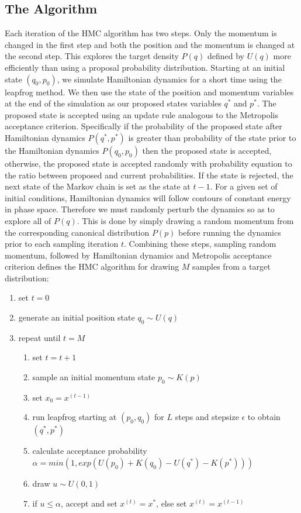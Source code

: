 \documentclass{article}
\numberwithin{equation}{section}
\begin{document}
\subsection{The Algorithm}
Each iteration of the HMC algorithm has two steps. Only the momentum is changed in the first step and both the position and the momentum is changed at the second step. This explores the target density $P(q)$ defined by $U(q)$ more efficiently than using a proposal probability distribution. Starting at an initial state $(q_0,p_0)$, we simulate Hamiltonian dynamics for a short time using the leapfrog method. We then use the state of the position and momentum variables at the end of the simulation as our proposed states variables $q^*$ and $p^*$. The proposed state is accepted using an update rule analogous to the Metropolis acceptance criterion. Specifically if the probability of the proposed state after Hamiltonian dynamics $P(q^*,p^*)$ is greater than probability of the state prior to the Hamiltonian dynamics $P(q_0,p_0)$ then the proposed state is accepted, otherwise, the proposed state is accepted randomly with probability equation to the ratio between proposed and current probabilities. If the state is rejected, the next state of the Markov chain is set as the state at $t-1$. For a given set of initial conditions, Hamiltonian dynamics will follow contours of constant energy in phase space. Therefore we must randomly perturb the dynamics so as to explore all of $P(q)$. This is done by simply drawing a random momentum from the corresponding canonical distribution $P(p)$  before running the dynamics prior to each sampling iteration $t$. Combining these steps, sampling random momentum, followed by Hamiltonian dynamics and Metropolis acceptance criterion defines the HMC algorithm for drawing $M$ samples from a target distribution:


\begin{enumerate}
\item set $t=0$
\item generate an initial position state $q_0 \sim U(q)$
\item repeat until $t=M$
\begin{enumerate}
\item set $t=t+1$
\item sample an initial momentum state $p_0 \sim K(p)$
\item set $x_0 = x^{(t-1)}$
\item run leapfrog starting at $(p_0,q_0)$ for $L$ steps and stepsize $\epsilon$ to obtain $(q^*,p^*)$
\item calculate acceptance probability $\alpha = min(1, exp(U(p_0)+K(q_0)-U(q^*)-K(p^*)))$
\item draw $u \sim U(0,1)$
\item if $u \leq \alpha$, accept and set $x^{(t)} = x^*$, else set  $x^{(t)} = x^{(t-1)}$
\end{enumerate}
\end{enumerate}
\end{document}

